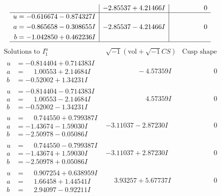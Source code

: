 \documentclass[1p]{elsarticle_modified}
\theoremstyle{definition}
\newcommand{\I}{\sqrt{-1}}
\begin{document}
$$\begin{array}{c|c|c}
 & -2.85537 + 4.21466 I & \phantom{-0.000000 } 0 \\ \hline\begin{aligned}
u &= -0.616674 - 0.874327 I \\
a &= -0.865658 - 0.308655 I \\
b &= -1.042850 + 0.462236 I\end{aligned}
 & -2.85537 - 4.21466 I & \phantom{-0.000000 } 0\\
 \hline 
 \end{array}$$\newpage$$\begin{array}{c|c|c}  
\text{Solutions to }I^u_{1}& \I (\text{vol} + \sqrt{-1}CS) & \text{Cusp shape}\\
 \hline 
\begin{aligned}
u &= -0.814404 + 0.714383 I \\
a &= \phantom{-}1.00553 + 2.14684 I \\
b &= -0.52002 + 1.34231 I\end{aligned}
 & \phantom{-0.000000 } -4.57359 I & \phantom{-0.000000 } 0 \\ \hline\begin{aligned}
u &= -0.814404 - 0.714383 I \\
a &= \phantom{-}1.00553 - 2.14684 I \\
b &= -0.52002 - 1.34231 I\end{aligned}
 & \phantom{-0.000000 -}4.57359 I & \phantom{-0.000000 } 0 \\ \hline\begin{aligned}
u &= \phantom{-}0.744550 + 0.799387 I \\
a &= -1.43674 - 1.59030 I \\
b &= -2.50978 - 0.05086 I\end{aligned}
 & -3.11037 - 2.87230 I & \phantom{-0.000000 } 0 \\ \hline\begin{aligned}
u &= \phantom{-}0.744550 - 0.799387 I \\
a &= -1.43674 + 1.59030 I \\
b &= -2.50978 + 0.05086 I\end{aligned}
 & -3.11037 + 2.87230 I & \phantom{-0.000000 } 0 \\ \hline\begin{aligned}
u &= \phantom{-}0.907254 + 0.638959 I \\
a &= \phantom{-}1.66458 + 1.44541 I \\
b &= \phantom{-}2.94097 - 0.92211 I\end{aligned}
 & \phantom{-}3.93257 + 5.67737 I & \phantom{-0.000000 } 0 \\ \hline\begin{aligned}

\end{aligned}
\end{array}$$
\end{document}
